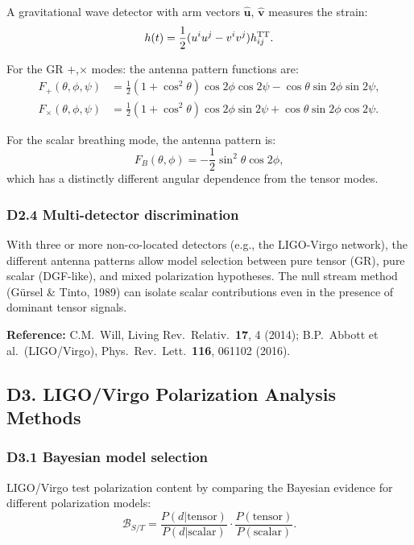 \documentclass[reprint]{revtex4-2}
\begin{document}
A gravitational wave detector with arm vectors $\hat{\mathbf{u}}$, $\hat{\mathbf{v}}$ measures the strain:
\begin{equation}
h(t) = \frac{1}{2}(u^i u^j - v^i v^j)h_{ij}^{\rm TT}.
\end{equation}

For the GR $+$,$\times$ modes: the antenna pattern functions are:
\begin{align}
F_+(\theta,\phi,\psi) &= \frac{1}{2}(1+\cos^2\theta)\cos 2\phi\cos 2\psi - \cos\theta\sin 2\phi\sin 2\psi,\\
F_\times(\theta,\phi,\psi) &= \frac{1}{2}(1+\cos^2\theta)\cos 2\phi\sin 2\psi + \cos\theta\sin 2\phi\cos 2\psi.
\end{align}

For the scalar breathing mode, the antenna pattern is:
\begin{equation}
F_B(\theta,\phi) = -\frac{1}{2}\sin^2\theta\cos 2\phi,
\end{equation}
which has a distinctly different angular dependence from the tensor modes.

\subsubsection{D2.4 Multi-detector discrimination}

With three or more non-co-located detectors (e.g., the LIGO-Virgo network), the different antenna patterns allow model selection between pure tensor (GR), pure scalar (DGF-like), and mixed polarization hypotheses. The null stream method (G\"ursel \& Tinto, 1989) can isolate scalar contributions even in the presence of dominant tensor signals.

\textbf{Reference:} C.M.\ Will, Living Rev.\ Relativ.\ \textbf{17}, 4 (2014); B.P.\ Abbott et al.\ (LIGO/Virgo), Phys.\ Rev.\ Lett.\ \textbf{116}, 061102 (2016).

\subsection{D3. LIGO/Virgo Polarization Analysis Methods}

\subsubsection{D3.1 Bayesian model selection}

LIGO/Virgo test polarization content by comparing the Bayesian evidence for different polarization models:
\begin{equation}
\mathcal{B}_{S/T} = \frac{P(d|\text{tensor})}{P(d|\text{scalar})}\cdot\frac{P(\text{tensor})}{P(\text{scalar})}.
\end{equation}
\end{document}
